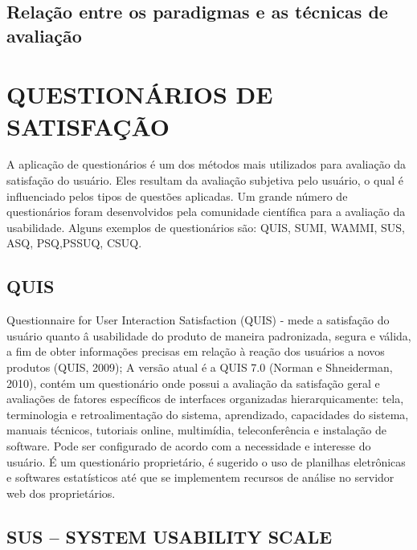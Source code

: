 \subsection{Relação entre os paradigmas e as técnicas de avaliação}


\section{QUESTIONÁRIOS DE SATISFAÇÃO}

A aplicação de questionários é um dos métodos mais utilizados para avaliação da satisfação do usuário. Eles resultam da avaliação subjetiva pelo usuário, o qual é influenciado pelos tipos de questões aplicadas.
Um grande número de questionários foram desenvolvidos pela comunidade científica para a avaliação da usabilidade.  Alguns exemplos de questionários são: QUIS, SUMI,  WAMMI, SUS, ASQ, PSQ,PSSUQ, CSUQ. 

\subsection{QUIS}

	Questionnaire for User Interaction Satisfaction (QUIS) - mede a satisfação do usuário quanto â usabilidade do produto de maneira padronizada, segura e válida, a fim de obter informações precisas em relação à reação dos usuários a novos produtos (QUIS, 2009);
	A versão atual é a QUIS 7.0 (Norman e Shneiderman, 2010), contém um questionário onde possui a avaliação da satisfação geral e avaliações de fatores específicos de interfaces organizadas hierarquicamente: tela, terminologia e retroalimentação do sistema, aprendizado, capacidades do sistema, manuais técnicos, tutoriais online, multimídia, teleconferência e instalação de software. Pode ser configurado de acordo com a necessidade e interesse do usuário. 
	É um questionário proprietário, é sugerido o uso de planilhas eletrônicas e softwares estatísticos até que se implementem recursos de análise no servidor web dos proprietários.
	
\subsection{SUS – SYSTEM USABILITY SCALE}

